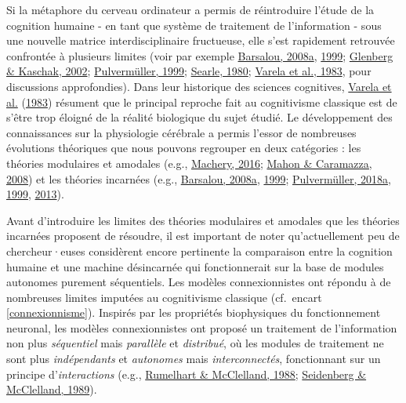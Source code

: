 \documentclass[
  a4paper,12pt,twoside,onecolumn,openright,final,oldfontcommands]{memoir}
\begin{document}
Si la métaphore du cerveau ordinateur a permis de réintroduire l'étude de la cognition humaine - en tant que système de traitement de l'information - sous une nouvelle matrice interdisciplinaire fructueuse, elle s'est rapidement retrouvée confrontée à plusieurs limites (voir par exemple \protect\hyperlink{ref-barsalou_grounded_2008}{Barsalou, 2008a}, \protect\hyperlink{ref-barsalou_perceptual_1999}{1999}; \protect\hyperlink{ref-glenberg_grounding_2002}{Glenberg \& Kaschak, 2002}; \protect\hyperlink{ref-pulvermuller_words_1999}{Pulvermüller, 1999}; \protect\hyperlink{ref-searle_minds_1980}{Searle, 1980}; \protect\hyperlink{ref-varela_inscription_1983}{Varela et al., 1983}, pour discussions approfondies). Dans leur historique des sciences cognitives, \protect\hyperlink{ref-varela_inscription_1983}{Varela et al.} (\protect\hyperlink{ref-varela_inscription_1983}{1983}) résument que le principal reproche fait au cognitivisme classique est de s'être trop éloigné de la réalité biologique du sujet étudié. Le développement des connaissances sur la physiologie cérébrale a permis l'essor de nombreuses évolutions théoriques que nous pouvons regrouper en deux catégories : les théories modulaires et amodales (e.g., \protect\hyperlink{ref-machery_amodal_2016}{Machery, 2016}; \protect\hyperlink{ref-mahon_critical_2008}{Mahon \& Caramazza, 2008}) et les théories incarnées (e.g., \protect\hyperlink{ref-barsalou_grounded_2008}{Barsalou, 2008a}, \protect\hyperlink{ref-barsalou_perceptual_1999}{1999}; \protect\hyperlink{ref-pulvermuller_neural_2018}{Pulvermüller, 2018a}, \protect\hyperlink{ref-pulvermuller_words_1999}{1999}, \protect\hyperlink{ref-pulvermuller_how_2013}{2013}).

Avant d'introduire les limites des théories modulaires et amodales que les théories incarnées proposent de résoudre, il est important de noter qu'actuellement peu de chercheur·euses considèrent encore pertinente la comparaison entre la cognition humaine et une machine désincarnée qui fonctionnerait sur la base de modules autonomes purement séquentiels. Les modèles connexionnistes ont répondu à de nombreuses limites imputées au cognitivisme classique (cf.~encart \ref{connexionnisme}). Inspirés par les propriétés biophysiques du fonctionnement neuronal, les modèles connexionnistes ont proposé un traitement de l'information non plus \emph{séquentiel} mais \emph{parallèle} et \emph{distribué}, où les modules de traitement ne sont plus \emph{indépendants} et \emph{autonomes} mais \emph{interconnectés}, fonctionnant sur un principe d'\emph{interactions} (e.g., \protect\hyperlink{ref-rumelhart_parallel_1988}{Rumelhart \& McClelland, 1988}; \protect\hyperlink{ref-seidenberg_distributed_1989}{Seidenberg \& McClelland, 1989}).
\end{document}

